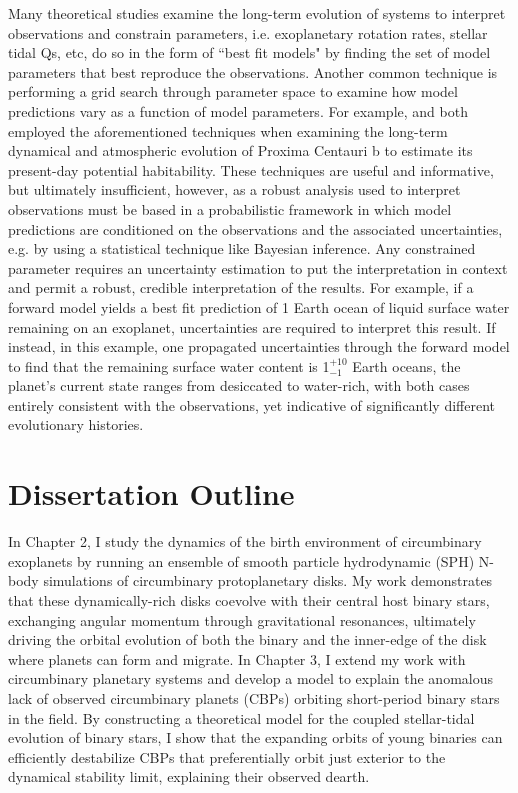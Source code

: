Many theoretical studies examine the long-term evolution of systems to interpret observations and constrain parameters, i.e. exoplanetary rotation rates, stellar tidal Qs, etc, do so in the form of ``best fit models" by finding the set of model parameters that best reproduce the observations.  Another common technique is performing a grid search through parameter space to examine how model predictions vary as a function of model parameters.  For example, \citet{Ribas2016} and \citet{Barnes2016} both employed the aforementioned techniques when examining the long-term dynamical and atmospheric evolution of Proxima Centauri b to estimate its present-day potential habitability.  These techniques are useful and informative, but ultimately insufficient, however, as a robust analysis used to interpret observations must be based in a probabilistic framework in which model predictions are conditioned on the observations and the associated uncertainties, e.g. by using a statistical technique like Bayesian inference.  Any constrained parameter requires an uncertainty estimation to put the interpretation in context and permit a robust, credible interpretation of the results.  For example, if a forward model yields a best fit prediction of 1 Earth ocean of liquid surface water remaining on an exoplanet, uncertainties are required to interpret this result.  If instead, in this example, one propagated uncertainties through the forward model to find that the remaining surface water content is 1$^{+10}_{-1}$ Earth oceans, the planet's current state ranges from desiccated to water-rich, with both cases entirely consistent with the observations, yet indicative of significantly different evolutionary histories.  

\section{Dissertation Outline}

In Chapter 2, I study the dynamics of the birth environment of circumbinary exoplanets by running an ensemble of smooth particle hydrodynamic (SPH) N-body simulations of circumbinary protoplanetary disks. My work demonstrates that these dynamically-rich disks coevolve with their central host binary stars, exchanging angular momentum through gravitational resonances, ultimately driving the orbital evolution of both the binary and the inner-edge of the disk where planets can form and migrate. In Chapter 3, I extend my work with circumbinary planetary systems and develop a model to explain the anomalous lack of observed circumbinary planets (CBPs) orbiting short-period binary stars in the \kepler field. By constructing a theoretical model for the coupled stellar-tidal evolution of binary stars, I show that the expanding orbits of young binaries can efficiently destabilize CBPs that preferentially orbit just exterior to the dynamical stability limit, explaining their observed dearth.

